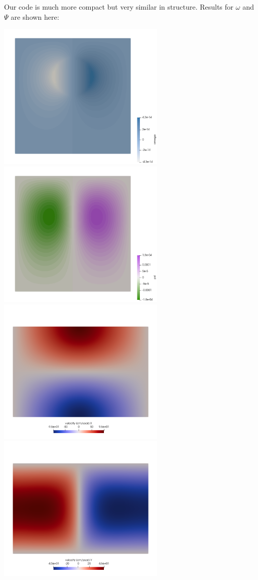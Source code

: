 Our code is much more compact but very similar in structure.
Results for $\omega$ and $\Psi$ are shown here:

\begin{center}
\includegraphics[width=8cm]{python_codes/fieldstone_153/results/exp1/omega}
\includegraphics[width=8cm]{python_codes/fieldstone_153/results/exp1/psi}\\
\includegraphics[width=8cm]{python_codes/fieldstone_153/results/exp1/u}
\includegraphics[width=8cm]{python_codes/fieldstone_153/results/exp1/v}\\

\end{center}
